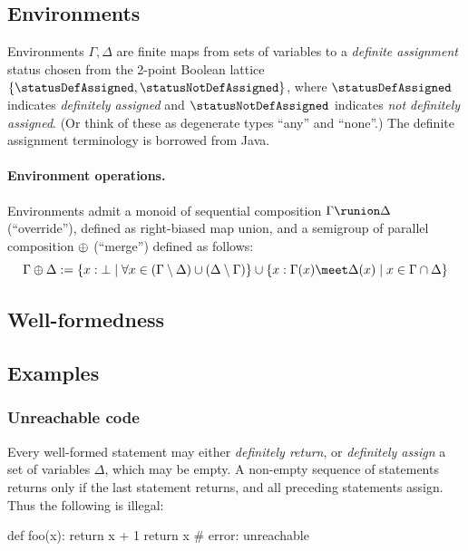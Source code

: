 \documentclass{scrartcl}
\begin{document}
\subsection{Environments}

Environments $\Gamma, \Delta$ are finite maps from sets of variables to a \emph{definite assignment} status
chosen from the 2-point Boolean lattice $\set{\statusDefAssigned, \statusNotDefAssigned}$, where
$\statusDefAssigned$ indicates \emph{definitely assigned} and $\statusNotDefAssigned$ indicates \emph{not
definitely assigned}. (Or think of these as degenerate types ``any'' and ``none''.) The definite assignment
terminology is borrowed from Java.

\paragraph{Environment operations.}

Environments admit a monoid of sequential composition $\Gamma \runion \Delta$ (``override''), defined as
right-biased map union, and a semigroup of parallel composition $\merge$ (``merge'') defined as follows:
%
\[\Gamma \merge \Delta := \set{x: \bot \mid \forall x \in (\Gamma \setminus \Delta) \cup (\Delta \setminus \Gamma)} \cup \set{x: \Gamma(x) \meet \Delta(x) \mid x \in \Gamma \cap \Delta}\]



\subsection{Well-formedness}



\subsection{Examples}
\subsubsection{Unreachable code}
Every well-formed statement may either \emph{definitely return}, or \emph{definitely assign} a set of
variables $\Delta$, which may be empty. A non-empty sequence of statements returns only if the last statement
returns, and all preceding statements assign. Thus the following is illegal:

\begin{python}
def foo(x):
  return x + 1
  return x    # error: unreachable
\end{python}
\end{document}
